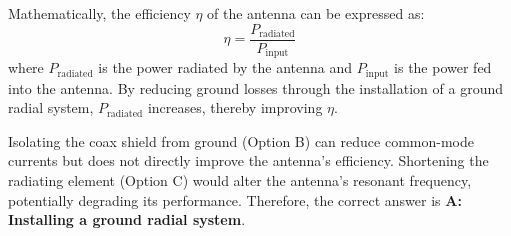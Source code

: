Mathematically, the efficiency \(\eta\) of the antenna can be expressed as:
\[
\eta = \frac{P_{\text{radiated}}}{P_{\text{input}}}
\]
where \(P_{\text{radiated}}\) is the power radiated by the antenna and \(P_{\text{input}}\) is the power fed into the antenna. By reducing ground losses through the installation of a ground radial system, \(P_{\text{radiated}}\) increases, thereby improving \(\eta\).

Isolating the coax shield from ground (Option B) can reduce common-mode currents but does not directly improve the antenna's efficiency. Shortening the radiating element (Option C) would alter the antenna's resonant frequency, potentially degrading its performance. Therefore, the correct answer is \textbf{A: Installing a ground radial system}.

